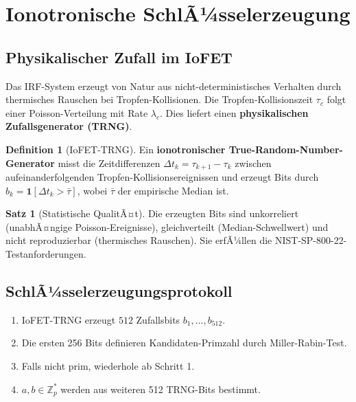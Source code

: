 ﻿\documentclass[a4paper,12pt]{scrreprt}
\theoremstyle{definition}
\newtheorem{definition}{Definition}[section]
\newtheorem{satz}{Satz}[section]
\begin{document}
\section{Ionotronische SchlÃ¼sselerzeugung}

\subsection{Physikalischer Zufall im IoFET}

Das IRF-System erzeugt von Natur aus nicht-deterministisches Verhalten
durch thermisches Rauschen bei Tropfen-Kollisionen. Die
Tropfen-Kollisionszeit $\tau_c$ folgt einer Poisson-Verteilung mit
Rate $\lambda_c$. Dies liefert einen \textbf{physikalischen
Zufallsgenerator (TRNG)}.

\begin{definition}[IoFET-TRNG]
  Ein \textbf{ionotronischer True-Random-Number-Gene\-rator} misst die
  Zeitdifferenzen $\Delta t_k = \tau_{k+1} - \tau_k$ zwischen
  aufeinanderfolgenden Tropfen-Kollisions\-ereignissen und erzeugt Bits
  durch $b_k = \mathbf{1}[\Delta t_k > \bar{\tau}]$, wobei
  $\bar\tau$ der empirische Median ist.
\end{definition}

\begin{satz}[Statistische QualitÃ¤t]
  Die erzeugten Bits sind unkorreliert (unabhÃ¤ngige Poisson-Ereignisse),
  gleichverteilt (Median-Schwellwert) und nicht reproduzierbar
  (thermisches Rauschen). Sie erfÃ¼llen die NIST-SP-800-22-Testanforderungen.
\end{satz}

\subsection{SchlÃ¼sselerzeugungsprotokoll}

\begin{enumerate}
  \item IoFET-TRNG erzeugt $512$ Zufallsbits $b_1,\ldots,b_{512}$.
  \item Die ersten 256 Bits definieren Kandidaten-Primzahl durch
    Miller-Rabin-Test.
  \item Falls nicht prim, wiederhole ab Schritt 1.
  \item $a, b \in \mathbb{Z}_p^*$ werden aus weiteren 512 TRNG-Bits
    bestimmt.
\end{enumerate}
\end{document}
